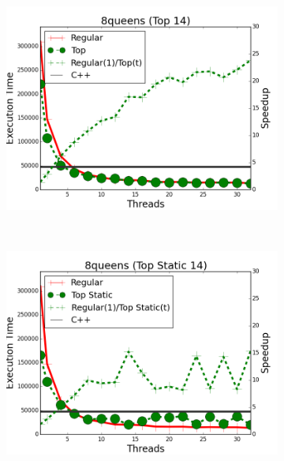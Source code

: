 \begin{figure}[]
        \centering
        \begin{subfigure}[b]{\plotsize\textwidth}
           \includegraphics[width=\textwidth]{experiments/coordination/cmp-top-8queens-14.png}
           \caption{}
           \label{fig:coordination:coord_14queenstop}
        \end{subfigure}
        ~
        \begin{subfigure}[b]{\plotsize\textwidth}
           \includegraphics[width=\textwidth]{experiments/coordination/cmp-top-static-8queens-14.png}
           \caption{}
           \label{fig:coordination:coord_14queenstopstatic}
        \end{subfigure} \\

\end{figure}
